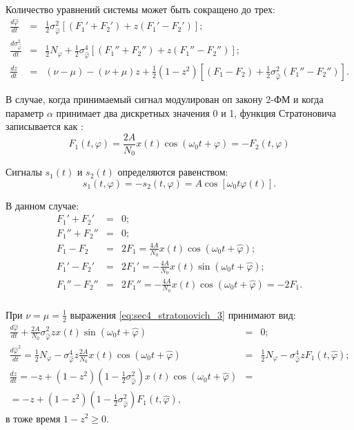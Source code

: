 Количество уравнений системы может быть сокращено до трех:
\begin{eqnarray}
	\frac{d \hat{\varphi}}{dt} & = & \frac{1}{2}\sigma_{\hat{\varphi}}^2 \left[(F_{1}' + F_{2}') + z(F_{1}' - F_{2}') \right]; \nonumber \\
	\frac{d \sigma_{\hat{\varphi}}^2}{dt} & = & \frac{1}{2}N_{\varphi} + \frac{1}{2}\sigma_{\hat{\varphi}}^4 \left[ (F_{1}'' + F_{2}'') +  z(F_{1}'' - F_{2}'') \right]; \\
	\frac{dz}{dt} & = & (\nu - \mu) - (\nu + \mu)z + \frac{1}{2}(1 - z^2) \left[ (F_{1} - F_{2}) +  \frac{1}{2} \sigma_{\hat{\varphi}}^2 (F_{1}'' - F_{2}'') \right]. \nonumber
	\label{eq:sec4_stratonovich_3}
\end{eqnarray}

В случае, когда принимаемый сигнал модулирован оп закону 2-ФМ и когда параметр ${\alpha}$ принимает два дискретных значения 0 и 1,
функция Стратоновича записывается как \cite{shahtarin-wiener-kalman}:
\begin{equation}
	F_1(t, \varphi) = \frac{2A}{N_0}x(t) \cos (\omega_0 t + \varphi) = -F_2(t, \varphi)
	\label{eq:sec4_stratonovich_bpsk}
\end{equation}

Сигналы ${s_1(t)}$ и ${s_2(t)}$ определяются равенством: 
\begin{equation}
	s_1(t, \varphi) = -s_2(t, \varphi) = A \cos \left[ \omega_0 t \varphi(t) \right].
	\label{eq:sec4_s1_s2}
\end{equation}

В данном случае:
\begin{eqnarray}
	F_1' + F_2' & = & 0; \nonumber \\
	F_1'' + F_2'' & = & 0; \nonumber \\
	F_1 - F_2 & = & 2F_1 = \frac{4A}{N_0}x(t) \cos(\omega_0 t + \hat{\varphi}); \nonumber \\
	F_1' - F_2' & = & 2F_1' = -\frac{4A}{N_0}x(t) \sin(\omega_0 t + \hat{\varphi}); \nonumber \\
	F_1'' - F_2'' & = & 2F_1'' = -\frac{4A}{N_0}x(t) \cos(\omega_0 t + \hat{\varphi}) = -2F_1. \nonumber \\
	\label{eq:sec4_strat_der}
\end{eqnarray}

При ${\nu = \mu = \frac{1}{2}}$ выражения \ref{eq:sec4_stratonovich_3} принимают вид:
\begin{eqnarray}
	\frac{d \hat{\varphi}}{dt} + \frac{2A}{N_0} \sigma_{\hat{\varphi}}^2 z x(t) \sin (\omega_0 t + \hat{\varphi}) & = & 0; \nonumber \\
	\frac{d \hat{\varphi}^2}{dt} = \frac{1}{2} N_{\varphi} - \sigma_{\hat{\varphi}}^4 z \frac{2A}{N_0} x(t) \cos(\omega_0 t + \hat{\varphi}) & = & \frac{1}{2}N_{\varphi} - \sigma_{\hat{\varphi}}^4 zF_1(t, \hat{\varphi}); \nonumber \\
	\frac{dz}{dt} = -z + (1 - z^2) \left( 1 - \frac{1}{2} \sigma_{\hat{\varphi}}^2 \right) x(t) \cos(\omega_0 t + \hat{\varphi}) & = & \nonumber \\
		 = -z + (1 - z^2) \left( 1 - \frac{1}{2} \sigma_{\hat{\varphi}}^2 \right) F_1(t, \hat{\varphi}), & &
	\label{eq:sec4_strat_der111}
\end{eqnarray}
в тоже время ${1 - z^2 \ge 0}$.


